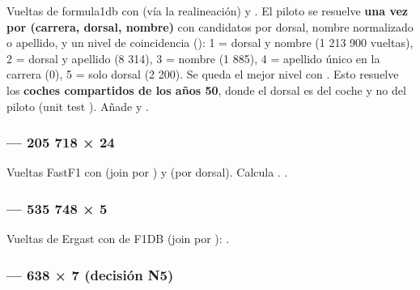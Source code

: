 Vueltas de formula1db con  (vía la realineación) y . El piloto se resuelve \textbf{una vez por (carrera, dorsal, nombre)} con candidatos por dorsal, nombre normalizado o apellido, y un nivel de coincidencia (): 1 = dorsal y nombre (1 213 900 vueltas), 2 = dorsal y apellido (8 314), 3 = nombre (1 885), 4 = apellido único en la carrera (0), 5 = solo dorsal (2 200). Se queda el mejor nivel con . Esto resuelve los \textbf{coches compartidos de los años 50}, donde el dorsal es del coche y no del piloto (unit test ). Añade  y .

\subsubsection{ — 205 718 × 24}

Vueltas FastF1 con  (join por ) y  (por dorsal). Calcula . .

\subsubsection{ — 535 748 × 5}

Vueltas de Ergast con  de F1DB (join por ): .

\subsubsection{ — 638 × 7 (decisión N5)}

